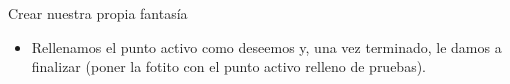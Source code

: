 \documentclass[aspectratio=169]{beamer}
\begin{document}
\begin{frame}{Crear nuestra propia fantasía}
\begin{itemize}
	\item Rellenamos el punto activo como deseemos y, una vez terminado, le damos a finalizar (poner la fotito con el punto activo relleno de pruebas).
\end{itemize}
\end{frame}
\end{document}
